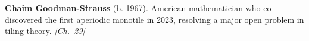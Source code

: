 \textbf{Chaim Goodman-Strauss} (b. 1967). American mathematician who co-discovered the first aperiodic monotile in 2023, resolving a major open problem in tiling theory. \emph{[Ch.~\hyperref[ch:hatmonotile]{29}]}

